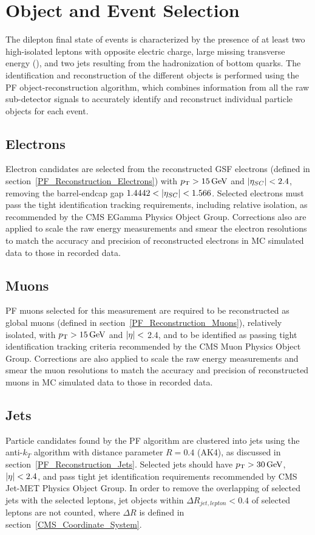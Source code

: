 \section{Object and Event Selection}
The dilepton final state of \ttbar events is characterized by the presence of at least two high-\pT isolated leptons with opposite electric charge, large missing transverse energy (\MET), and two jets resulting from the hadronization of bottom quarks.
The identification and reconstruction of the different objects is performed using the PF object-reconstruction algorithm, which combines information from all the raw sub-detector signals to accurately identify and reconstruct individual particle objects for each event. 
\subsection{Electrons}
Electron candidates are selected from the reconstructed GSF electrons (defined in section~\ref{PF_Reconstruction_Electrons}) with $\pT > \SI{15}{\GeV}$ and $\left\vert\eta_{SC}\right\vert< 2.4$, removing the barrel-endcap gap $1.4442 < \left\vert\eta_{SC}\right\vert< 1.566$. 
Selected electrons must pass the tight identification tracking requirements, including relative isolation, as recommended by the CMS EGamma Physics Object Group.
Corrections also are applied to scale the raw energy measurements and smear the electron resolutions to match the accuracy and precision of reconstructed electrons in MC simulated data to those in recorded data.
\subsection{Muons}
PF muons selected for this measurement are required to be reconstructed as global muons (defined in section~\ref{PF_Reconstruction_Muons}), relatively isolated, with $\pT > \SI{15}{\GeV}$ and $\left\vert\eta\right\vert<$ 2.4, and to be identified as passing tight identification tracking criteria recommended by the CMS Muon Physics Object Group.
Corrections are also applied to scale the raw energy measurements and smear the muon resolutions to match the accuracy and precision of reconstructed muons in MC simulated data to those in recorded data.
\subsection{Jets}
Particle candidates found by the PF algorithm are clustered into jets using the anti-$k_T$ algorithm with distance parameter $R = 0.4$ (AK4), as discussed in section~\ref{PF_Reconstruction_Jets}. 
Selected jets should have $\pT > \SI{30}{\GeV}$, $\left\vert\eta\right\vert <2.4$, and pass tight jet identification requirements recommended by CMS Jet-MET Physics Object Group.
In order to remove the overlapping of selected jets with the selected leptons, jet objects within $\Delta R_{jet,lepton} < 0.4$ of selected leptons are not counted, where $\Delta R$ is defined in section~\ref{CMS_Coordinate_System}.
